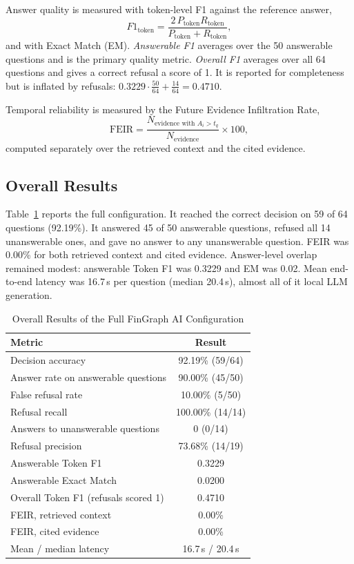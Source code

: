 \documentclass[conference]{IEEEtran}
\begin{document}
Answer quality is measured with token-level F1 against the reference answer,
\begin{equation}
F1_{\text{token}} = \frac{2\,P_{\text{token}}R_{\text{token}}}{P_{\text{token}}+R_{\text{token}}},
\end{equation}
and with Exact Match (EM). \textit{Answerable F1} averages over the 50 answerable questions and is the primary quality metric. \textit{Overall F1} averages over all 64 questions and gives a correct refusal a score of 1. It is reported for completeness but is inflated by refusals: $0.3229\cdot\tfrac{50}{64} + \tfrac{14}{64} = 0.4710$.

Temporal reliability is measured by the Future Evidence Infiltration Rate,
\begin{equation}
\mathrm{FEIR} = \frac{N_{\text{evidence with } A_i > t_q}}{N_{\text{evidence}}}\times100,
\end{equation}
computed separately over the retrieved context and the cited evidence.

\subsection{Overall Results}
Table~\ref{tab:overall} reports the full configuration. It reached the correct decision on 59 of 64 questions (92.19\%). It answered 45 of 50 answerable questions, refused all 14 unanswerable ones, and gave no answer to any unanswerable question. FEIR was 0.00\% for both retrieved context and cited evidence. Answer-level overlap remained modest: answerable Token F1 was 0.3229 and EM was 0.02. Mean end-to-end latency was 16.7\,s per question (median 20.4\,s), almost all of it local LLM generation.

\begin{table}[t]
\caption{Overall Results of the Full FinGraph AI Configuration}
\label{tab:overall}
\centering
\footnotesize
\begin{tabular}{lc}
\toprule
\textbf{Metric} & \textbf{Result}\\
\midrule
Decision accuracy & 92.19\% (59/64)\\
Answer rate on answerable questions & 90.00\% (45/50)\\
False refusal rate & 10.00\% (5/50)\\
Refusal recall & 100.00\% (14/14)\\
Answers to unanswerable questions & 0 (0/14)\\
Refusal precision & 73.68\% (14/19)\\
\midrule
Answerable Token F1 & 0.3229\\
Answerable Exact Match & 0.0200\\
Overall Token F1 (refusals scored 1) & 0.4710\\
\midrule
FEIR, retrieved context & 0.00\%\\
FEIR, cited evidence & 0.00\%\\
\midrule
Mean / median latency & 16.7\,s / 20.4\,s\\
\bottomrule
\end{tabular}
\end{table}
\end{document}
